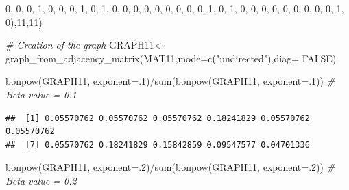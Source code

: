 \documentclass[
  notitlepage,
  onecolumn,
  openany]{book}
\newenvironment{Shaded}{\begin{snugshade}}{\end{snugshade}}
\newcommand{\AttributeTok}[1]{\textcolor[rgb]{0.77,0.63,0.00}{#1}}
\newcommand{\CommentTok}[1]{\textcolor[rgb]{0.56,0.35,0.01}{\textit{#1}}}
\newcommand{\ConstantTok}[1]{\textcolor[rgb]{0.00,0.00,0.00}{#1}}
\newcommand{\DecValTok}[1]{\textcolor[rgb]{0.00,0.00,0.81}{#1}}
\newcommand{\FunctionTok}[1]{\textcolor[rgb]{0.00,0.00,0.00}{#1}}
\newcommand{\NormalTok}[1]{#1}
\newcommand{\OtherTok}[1]{\textcolor[rgb]{0.56,0.35,0.01}{#1}}
\newcommand{\SpecialCharTok}[1]{\textcolor[rgb]{0.00,0.00,0.00}{#1}}
\newcommand{\StringTok}[1]{\textcolor[rgb]{0.31,0.60,0.02}{#1}}
\begin{document}
\begin{Shaded}
\begin{Highlighting}[]
\DecValTok{0}\NormalTok{, }\DecValTok{0}\NormalTok{, }\DecValTok{0}\NormalTok{, }\DecValTok{1}\NormalTok{, }\DecValTok{0}\NormalTok{, }\DecValTok{0}\NormalTok{, }\DecValTok{0}\NormalTok{, }\DecValTok{1}\NormalTok{, }\DecValTok{0}\NormalTok{, }\DecValTok{1}\NormalTok{, }\DecValTok{0}\NormalTok{,}
\DecValTok{0}\NormalTok{, }\DecValTok{0}\NormalTok{, }\DecValTok{0}\NormalTok{, }\DecValTok{0}\NormalTok{, }\DecValTok{0}\NormalTok{, }\DecValTok{0}\NormalTok{, }\DecValTok{0}\NormalTok{, }\DecValTok{0}\NormalTok{, }\DecValTok{1}\NormalTok{, }\DecValTok{0}\NormalTok{, }\DecValTok{1}\NormalTok{,}
\DecValTok{0}\NormalTok{, }\DecValTok{0}\NormalTok{, }\DecValTok{0}\NormalTok{, }\DecValTok{0}\NormalTok{, }\DecValTok{0}\NormalTok{, }\DecValTok{0}\NormalTok{, }\DecValTok{0}\NormalTok{, }\DecValTok{0}\NormalTok{, }\DecValTok{0}\NormalTok{, }\DecValTok{1}\NormalTok{, }\DecValTok{0}\NormalTok{),}\DecValTok{11}\NormalTok{,}\DecValTok{11}\NormalTok{)}

\CommentTok{\# Creation of the graph}
\NormalTok{GRAPH11}\OtherTok{\textless{}{-}}\FunctionTok{graph\_from\_adjacency\_matrix}\NormalTok{(MAT11,}\AttributeTok{mode=}\FunctionTok{c}\NormalTok{(}\StringTok{"undirected"}\NormalTok{),}\AttributeTok{diag=} \ConstantTok{FALSE}\NormalTok{)}

\FunctionTok{bonpow}\NormalTok{(GRAPH11, }\AttributeTok{exponent=}\NormalTok{.}\DecValTok{1}\NormalTok{)}\SpecialCharTok{/}\FunctionTok{sum}\NormalTok{(}\FunctionTok{bonpow}\NormalTok{(GRAPH11, }\AttributeTok{exponent=}\NormalTok{.}\DecValTok{1}\NormalTok{)) }\CommentTok{\# Beta value = 0.1}
\end{Highlighting}
\end{Shaded}

\begin{verbatim}
##  [1] 0.05570762 0.05570762 0.05570762 0.18241829 0.05570762 0.05570762
##  [7] 0.05570762 0.18241829 0.15842859 0.09547577 0.04701336
\end{verbatim}

\begin{Shaded}
\begin{Highlighting}[]
\FunctionTok{bonpow}\NormalTok{(GRAPH11, }\AttributeTok{exponent=}\NormalTok{.}\DecValTok{2}\NormalTok{)}\SpecialCharTok{/}\FunctionTok{sum}\NormalTok{(}\FunctionTok{bonpow}\NormalTok{(GRAPH11, }\AttributeTok{exponent=}\NormalTok{.}\DecValTok{2}\NormalTok{)) }\CommentTok{\# Beta value = 0.2}
\end{Highlighting}
\end{Shaded}
\end{document}
